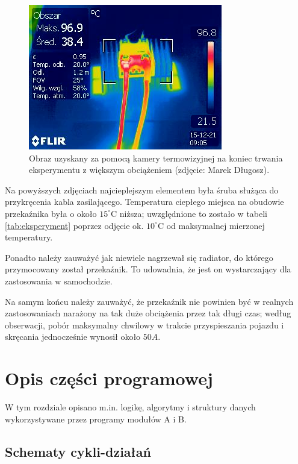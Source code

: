 \begin{figure}[H]
	\centering
	\includegraphics[scale=0.8]{flir/IR_5170.jpg}
	\caption{\label{fig:flir1}Obraz uzyskany za pomocą kamery termowizyjnej na koniec trwania eksperymentu z większym obciążeniem (zdjęcie: Marek Długosz).}
\end{figure}

Na powyższych zdjęciach najcieplejszym elementem była śruba służąca do przykręcenia kabla zasilającego. Temperatura ciepłego miejsca na obudowie przekaźnika była o około $ 15^{\circ}\mathrm{C} $ niższa; uwzględnione to zostało w tabeli \ref{tab:eksperyment} poprzez odjęcie ok. $ 10^{\circ}\mathrm{C} $ od maksymalnej mierzonej temperatury.

Ponadto należy zauważyć jak niewiele nagrzewał się radiator, do którego przymocowany został przekaźnik. To udowadnia, że jest on wystarczający dla zastosowania w samochodzie.

Na samym końcu należy zauważyć, że przekaźnik nie powinien być w realnych zastosowaniach narażony na tak duże obciążenia przez tak długi czas; według obserwacji, pobór maksymalny chwilowy w trakcie przyspieszania pojazdu i skręcania jednocześnie wynosił około $ 50A $.


\section{Opis części programowej}
\label{sec:opis_cz_programowej}

W tym rozdziale opisano m.in. logikę, algorytmy i struktury danych wykorzystywane przez programy modułów A i B.

\subsection{Schematy cykli-działań}
\label{subsec:schematy_cykli_dzialan}

